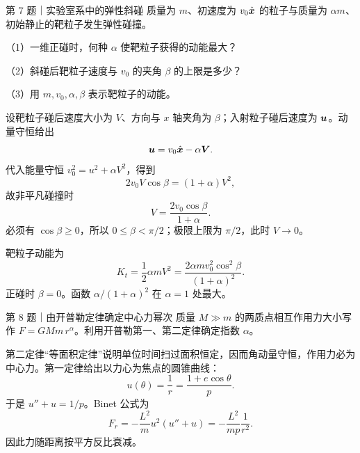 \begin{problem}{第 7 题｜实验室系中的弹性斜碰}
质量为 $m$、初速度为 $v_0\hat{\bm{x}}$ 的粒子与质量为 $\alpha m$、初始静止的靶粒子发生弹性碰撞。

（1）一维正碰时，何种 $\alpha$ 使靶粒子获得的动能最大？

（2）斜碰后靶粒子速度与 $v_0$ 的夹角 $\beta$ 的上限是多少？

（3）用 $m,v_0,\alpha,\beta$ 表示靶粒子的动能。
\end{problem}
\begin{solution}
设靶粒子碰后速度大小为 $V$、方向与 $x$ 轴夹角为 $\beta$；入射粒子碰后速度为 $\bm{u}$。动量守恒给出
\[
\bm{u}=v_0\hat{\bm{x}}-\alpha\bm{V}.
\]
代入能量守恒 $v_0^2=u^2+\alpha V^2$，得到
\[
2v_0V\cos\beta=(1+\alpha)V^2,
\]
故非平凡碰撞时
\[
V=\frac{2v_0\cos\beta}{1+\alpha}.
\]
必须有 $\cos\beta\ge0$，所以 $0\le\beta<\pi/2$；极限上限为 $\pi/2$，此时 $V\to0$。

靶粒子动能为
\[
K_t=\frac12\alpha mV^2
=\frac{2\alpha m v_0^2\cos^2\beta}{(1+\alpha)^2}.
\]
正碰时 $\beta=0$。函数 $\alpha/(1+\alpha)^2$ 在 $\alpha=1$ 处最大。
\end{solution}

\begin{problem}{第 8 题｜由开普勒定律确定中心力幂次}
质量 $M\gg m$ 的两质点相互作用力大小写作 $F=GMm\,r^{\alpha}$。利用开普勒第一、第二定律确定指数 $\alpha$。
\end{problem}
\begin{solution}
第二定律“等面积定律”说明单位时间扫过面积恒定，因而角动量守恒，作用力必为中心力。第一定律给出以力心为焦点的圆锥曲线：
\[
u(\theta)=\frac1r=\frac{1+e\cos\theta}{p}.
\]
于是 $u''+u=1/p$。Binet 公式为
\[
F_r=-\frac{L^2}{m}u^2(u''+u)
=-\frac{L^2}{mp}\frac1{r^2}.
\]
因此力随距离按平方反比衰减。
\end{solution}

